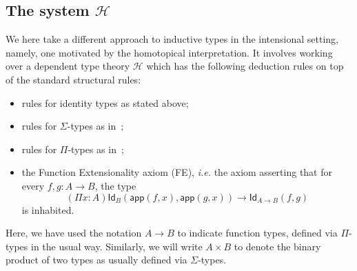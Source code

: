\documentclass{article}
\newcommand{\Id}{\mathsf{Id}}
\newcommand{\id}[1]{\Id_{#1}}
\newcommand{\app}{\mathsf{app}}
\newcommand{\Hint}{\mathcal{H}}
\theoremstyle{remark}
\theoremstyle{definition}
\begin{document}
\subsection{The system $\Hint$} 

\noindent We here take a different approach to inductive types in the intensional setting, namely, one motivated by the homotopical interpretation.  It involves working over a dependent type theory $\Hint$ which has the following deduction rules on top of the standard structural rules:
\begin{itemize}
\item rules for identity types as stated above;
\item rules for $\Sigma$-types as in~\cite[Section~5.8]{NordstromB:marltt};
\item rules for $\Pi$-types as in~\cite[Section~3.2]{GarnerR:strdpt}; 
\item the Function Extensionality axiom (FE), \emph{i.e.} the axiom asserting that
for every $f, g : A \rightarrow B$, the type
\[
(\Pi x :  A)\id{B}( \app(f, x), \app(g, x)) \rightarrow \id{A \rightarrow B}(f,g) 
\]
is inhabited.
\end{itemize}
Here, we have used the notation $A \rightarrow B$ to indicate function types, defined via
$\Pi$-types in the usual way. Similarly, we will write $A \times B$ to denote the binary product
of two types as usually defined via $\Sigma$-types.
\smallskip
\end{document}
